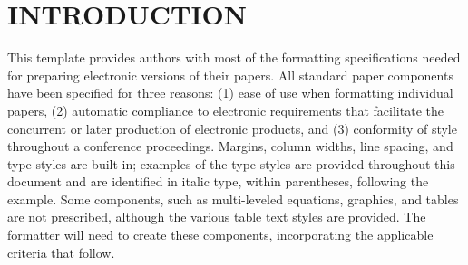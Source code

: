 \section{INTRODUCTION} 

This template provides authors with most of the formatting specifications needed 
for preparing electronic versions of their papers. All standard paper components 
have been specified for three reasons: (1) ease of use when formatting 
individual papers, (2) automatic compliance to electronic requirements that 
facilitate the concurrent or later production of electronic products, and (3) 
conformity of style throughout a conference proceedings. Margins, column widths, 
line spacing, and type styles are built-in; examples of the type styles are 
provided throughout this document and are identified in italic type, within 
parentheses, following the example. Some components, such as multi-leveled 
equations, graphics, and tables are not prescribed, although the various table 
text styles are provided. The formatter will need to create these components, 
incorporating the applicable criteria that follow.

% 